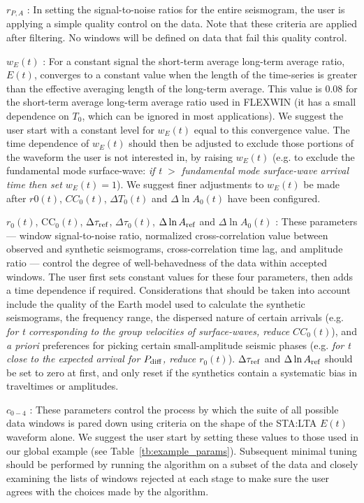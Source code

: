 $r_{P,A}$ : In setting the signal-to-noise ratios for the entire seismogram, the
user is applying a simple quality control on the data.  Note that these criteria 
are applied after filtering.  No windows will be defined on data that fail this
quality control.  

$w_E(t)$ : For a constant signal the short-term average long-term average ratio, $E(t)$,
converges to a constant value when
the length of the time-series is greater than the effective averaging length of
the long-term average.  This value is 0.08 for the short-term average long-term average ratio used in FLEXWIN (it has a small dependence on $T_0$, which can be ignored in most applications).  We suggest the user start with a constant
level for $w_E(t)$ equal to this convergence value.  The time dependence of
$w_E(t)$ should then be adjusted to exclude those portions of the waveform the
user is not interested in, by raising $w_E(t)$ (e.g. to exclude the fundamental
mode surface-wave: {\em if t $>$ fundamental mode surface-wave arrival time then set $w_E(t)=1$}).  
We suggest finer adjustments to $w_E(t)$ be made after $r0(t)$,
$CC_0(t)$, $\Delta T_0(t)$ and $\Delta \ln A_0(t)$ have been configured.

$r_0(t)$, $\mathrm{CC}_0(t)$, $\Delta \tau_{\rm ref}$, $\Delta
\tau_0(t)$, $\Delta \ln A_{\rm ref}$ and $\Delta \ln A_0(t)$ : These parameters ---
window signal-to-noise ratio, normalized cross-correlation value between
observed and synthetic seismograms, cross-correlation time lag, and amplitude
ratio --- control the degree of well-behavedness of the data within accepted
windows.  The user first sets constant values for these four parameters, then
adds a time dependence if required.  Considerations that should be taken into
account include the quality of the Earth model used to calculate the synthetic
seismograms, the frequency range, the dispersed nature of certain arrivals (e.g.
{\em for t corresponding to the group velocities of surface-waves, reduce
$CC_0(t)$}), and {\em a priori} preferences for picking certain small-amplitude seismic phases
(e.g. {\em for t close to the expected arrival for $P_{\rm diff}$, reduce $r_0(t)$}).  
$\Delta \tau_{\rm ref}$ and $\Delta \ln A_{\rm ref}$ should be set to zero at first, and only
reset if the synthetics contain a systematic bias in traveltimes or amplitudes.


$c_{0-4}$ : These parameters control the process by which the suite of all possible data windows is pared down using criteria on the shape of the STA:LTA $E(t)$ waveform alone.  We suggest the user start by setting these values to those used in our global example (see Table~\ref{tb:example_params}).  Subsequent minimal tuning should be performed by running the algorithm on a subset of the data and closely examining the lists of windows rejected at each stage to make sure the user agrees with the choices made by the algorithm.  

